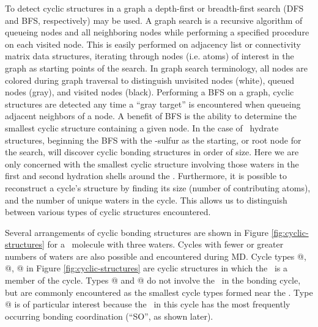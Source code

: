 \documentclass{article}
\makeatletter
\newcommand{\Rmnum}[1]{\expandafter\@slowromancap\romannumeral #1@}
\makeatother
\begin{document}
To detect cyclic structures in a graph a depth-first or breadth-first search (DFS and BFS, respectively) may be used.\cite{Knuth1997, Cormen 2001} A graph search is a recursive algorithm of queueing nodes and all neighboring nodes while performing a specified procedure on each visited node. This is easily performed on adjacency list or connectivity matrix data structures, iterating through nodes (i.e. atoms) of interest in the graph as starting points of the search. In graph search terminology, all nodes are colored during graph traversal to distinguish unvisited nodes (white), queued nodes (gray), and visited nodes (black). Performing a BFS on a graph, cyclic structures are detected any time a ``gray target'' is encountered when queueing adjacent neighbors of a node. A benefit of BFS is the ability to determine the smallest cyclic structure containing a given node. In the case of \suldiox~hydrate structures, beginning the BFS with the \suldiox-sulfur as the starting, or root node for the search, will discover cyclic bonding structures in order of size. Here we are only concerned with the smallest cyclic structure involving those waters in the first and second hydration shells around the \suldiox. Furthermore, it is possible to reconstruct a cycle's structure by finding its size (number of contributing atoms), and the number of unique waters in the cycle. This allows us to distinguish between various types of cyclic structures encountered.

Several arrangements of cyclic bonding structures are shown in Figure \ref{fig:cyclic-structures} for a \suldiox~molecule with three waters. Cycles with fewer or greater numbers of waters are also possible and encountered during MD. Cycle types \Rmnum{1}, \Rmnum{2}, \Rmnum{3} in Figure \ref{fig:cyclic-structures} are cyclic structures in which the \suldiox~is a member of the cycle. Types \Rmnum{4} and \Rmnum{5} do not involve the \suldiox~in the bonding cycle, but are commonly encountered as the smallest cycle types formed near the \suldiox. Type \Rmnum{3} is of particular interest because the \suldiox~in this cycle has the most frequently occurring bonding coordination (``SO'', as shown later).
\end{document}
